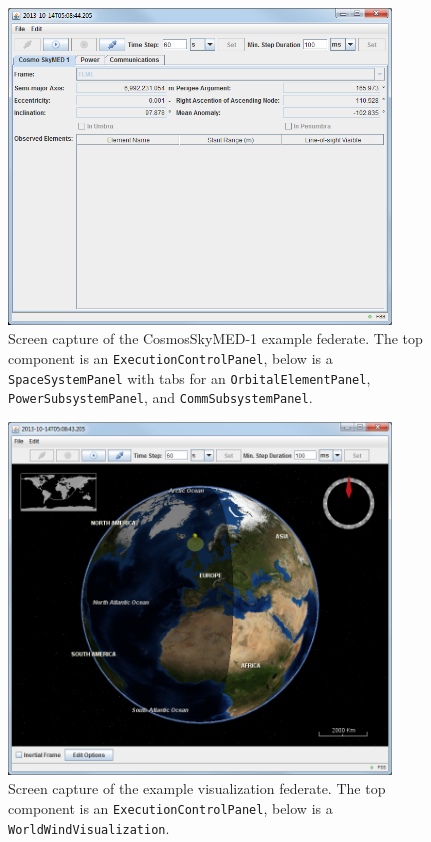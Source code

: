\documentclass[]{article}
\begin{document}
\begin{figure}[p]
\centering
\includegraphics[width=4in]{cosmosScreenCapture}
\caption{Screen capture of the CosmosSkyMED-1 example federate. The top component is an \texttt{ExecutionControlPanel}, below is a \texttt{SpaceSystemPanel} with tabs for an \texttt{OrbitalElementPanel}, \texttt{PowerSubsystemPanel}, and \texttt{CommSubsystemPanel}.}
\label{fig:cosmosScreenCapture}
\end{figure}

\begin{figure}[p]
\centering
\includegraphics[width=4in]{visualizationScreenCapture}
\caption{Screen capture of the example visualization federate. The top component is an \texttt{ExecutionControlPanel}, below is a \texttt{WorldWindVisualization}.}
\label{fig:visualizationScreenCapture}
\end{figure}
\end{document}
